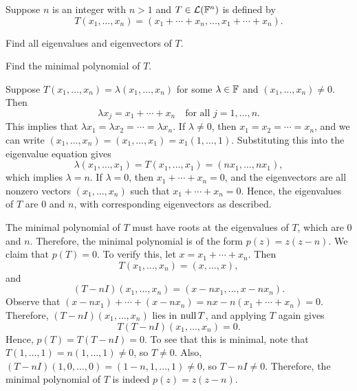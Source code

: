 \begin{exc}
\begin{exercise}
Suppose $n$ is an integer with $n>1$ and $T\in\mathcal{L}(\mathbb{F}^n)$ is defined by
\[ T(x_1,\dots,x_n)=(x_1+\cdots+x_n,\dots,x_1+\cdots+x_n). \]
\begin{parts}
\item Find all eigenvalues and eigenvectors of $T$.
\item Find the minimal polynomial of $T$.
\end{parts}
\end{exercise}
\begin{solution}\leavevmode
\begin{parts}
\item Suppose $T(x_1,\dots,x_n)=\lambda(x_1,\dots,x_n)$ for some
  $\lambda\in\mathbb{F}$ and $(x_1,\dots,x_n)\ne0$. Then
  \[ \lambda x_j=x_1+\cdots+x_n \quad\text{for all } j=1,\dots,n. \]
  This implies that $\lambda x_1=\lambda x_2=\cdots=\lambda x_n$. If
  $\lambda\ne0$, then $x_1=x_2=\cdots=x_n$, and we can write
  $(x_1,\dots,x_n)=(x_1,\dots,x_1)=x_1(1,\dots,1)$. Substituting this into the
  eigenvalue equation gives
  \[ \lambda(x_1,\dots,x_1)=T(x_1,\dots,x_1)=(nx_1,\dots,nx_1), \]
  which implies $\lambda=n$. If $\lambda=0$, then $x_1+\cdots+x_n=0$, and the
  eigenvectors are all nonzero vectors $(x_1,\dots,x_n)$ such that
  $x_1+\cdots+x_n=0$. Hence, the eigenvalues of $T$ are $0$ and $n$, with
  corresponding eigenvectors as described.
\item The minimal polynomial of $T$ must have roots at the eigenvalues of $T$,
  which are $0$ and $n$. Therefore, the minimal polynomial is of the form
  $p(z)=z(z-n)$. We claim that $p(T)=0$. To verify this, let
  $x=x_1+\cdots+x_n$. Then
  \[ T(x_1,\dots,x_n)=(x,\dots,x), \]
  and
  \[ (T-nI)(x_1,\dots,x_n)=(x-nx_1,\dots,x-nx_n). \]
  Observe that $(x-nx_1)+\cdots+(x-nx_n)=nx-n(x_1+\cdots+x_n)=0$. Therefore,
  $(T-nI)(x_1,\dots,x_n)$ lies in $\operatorname{null} T$, and applying $T$ again gives
  \[ T(T-nI)(x_1,\dots,x_n)=0. \]
  Hence, $p(T)=T(T-nI)=0$. To see that this is minimal, note that
  $T(1,\dots,1)=n(1,\dots,1)\ne0$, so $T\ne0$. Also,
  $(T-nI)(1,0,\dots,0)=(1-n,1,\dots,1)\ne0$, so $T-nI\ne0$. Therefore, the
  minimal polynomial of $T$ is indeed $p(z)=z(z-n)$. \qedhere
\end{parts}
\end{solution}


\end{exc}
